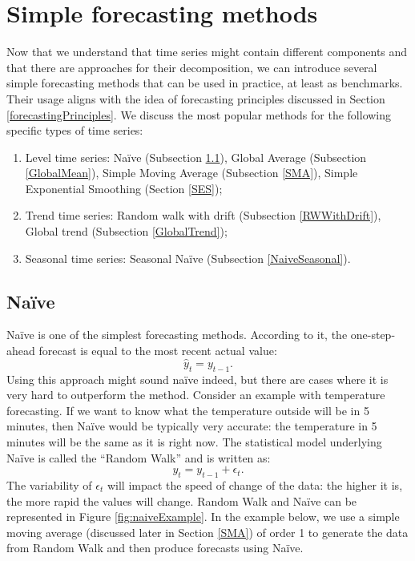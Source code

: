 \documentclass[]{book}
\providecommand{\tightlist}{%
  \setlength{\itemsep}{0pt}\setlength{\parskip}{0pt}}
\theoremstyle{definition}
\theoremstyle{definition}
\theoremstyle{definition}
\theoremstyle{definition}
\theoremstyle{remark}
\begin{document}
\hypertarget{simpleForecastingMethods}{%
\section{Simple forecasting methods}\label{simpleForecastingMethods}}

Now that we understand that time series might contain different components and that there are approaches for their decomposition, we can introduce several simple forecasting methods that can be used in practice, at least as benchmarks. Their usage aligns with the idea of forecasting principles discussed in Section \ref{forecastingPrinciples}. We discuss the most popular methods for the following specific types of time series:

\begin{enumerate}
\def\labelenumi{\arabic{enumi}.}
\tightlist
\item
  Level time series: Naïve (Subsection \ref{Naive}), Global Average (Subsection \ref{GlobalMean}), Simple Moving Average (Subsection \ref{SMA}), Simple Exponential Smoothing (Section \ref{SES});
\item
  Trend time series: Random walk with drift (Subsection \ref{RWWithDrift}), Global trend (Subsection \ref{GlobalTrend});
\item
  Seasonal time series: Seasonal Naïve (Subsection \ref{NaiveSeasonal}).
\end{enumerate}

\hypertarget{Naive}{%
\subsection{Naïve}\label{Naive}}

Naïve is one of the simplest forecasting methods. According to it, the one-step-ahead forecast is equal to the most recent actual value:
\begin{equation}
    \hat{y}_t = y_{t-1} .
    \label{eq:Naive}
\end{equation}
Using this approach might sound naïve indeed, but there are cases where it is very hard to outperform the method. Consider an example with temperature forecasting. If we want to know what the temperature outside will be in 5 minutes, then Naïve would be typically very accurate: the temperature in 5 minutes will be the same as it is right now. The statistical model underlying Naïve is called the ``Random Walk'' and is written as:
\begin{equation}
    y_t = y_{t-1} + \epsilon_t.
    \label{eq:RandomWalk}
\end{equation}
The variability of \(\epsilon_t\) will impact the speed of change of the data: the higher it is, the more rapid the values will change. Random Walk and Naïve can be represented in Figure \ref{fig:naiveExample}. In the example below, we use a simple moving average (discussed later in Section \ref{SMA}) of order 1 to generate the data from Random Walk and then produce forecasts using Naïve.
\end{document}
